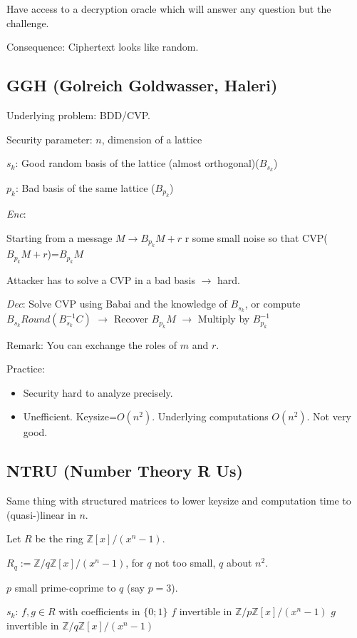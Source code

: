 \documentclass[a4paper,10pt]{article}
\begin{document}
Have access to a decryption oracle which will answer any question but the challenge.

Consequence: Ciphertext looks like random.

\subsection{GGH (Golreich Goldwasser, Haleri)}

Underlying problem: BDD/CVP.

Security parameter: $n$, dimension of a lattice

$s_k$: Good random basis of the lattice (almost orthogonal)($B_{s_k}$)

$p_k$: Bad basis of the same lattice ($B_{p_k}$)

\textit{Enc}:

Starting from a message $M \rightarrow B_{p_k} M+r$ r some small noise so that CVP($B_{p_k} M+r$)=$B_{p_k} M$

Attacker has to solve a CVP in a bad basis $\rightarrow$ hard.

\textit{Dec}: Solve CVP using Babai and the knowledge of $B_{s_k}$, or compute $B_{s_k} Round(B_{s_k}^{-1} C)$
$\rightarrow$ Recover $B_{p_k} M$
$\rightarrow$ Multiply by $B_{p_k}^{-1}$

Remark: You can exchange the roles of $m$ and $r$.

Practice: 
\begin{itemize}
\item Security hard to analyze precisely.
\item Unefficient. Keysize=$O(n^2)$. Underlying computations $O(n^2)$. Not very good.
\end{itemize}

\subsection{NTRU (Number Theory R Us)}

Same thing with structured matrices to lower keysize and computation time to (quasi-)linear in $n$.

Let $R$ be the ring $\mathbb{Z}[x]/(x^n-1)$.

$R_q := \mathbb{Z}/q \mathbb{Z}[x]/(x^n-1)$, for $q$ not too small, $q$ about $n^2$.

$p$ small prime-coprime to $q$ (say $p=3$).

$s_k$: $f, g \in R$ with coefficients in $\{0;1\}$
$f$ invertible in $\mathbb{Z}/p \mathbb{Z}[x]/(x^n-1)$
$g$ invertible in $\mathbb{Z}/q \mathbb{Z}[x]/(x^n-1)$
\end{document}
